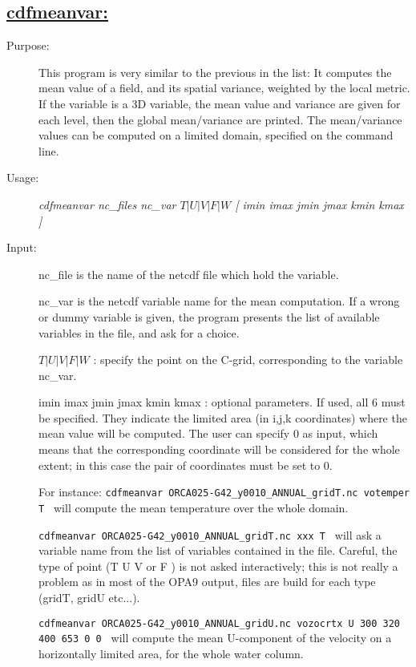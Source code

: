\documentclass[a4paper,11pt]{article}
\begin{document}
\subsection*{\underline{cdfmeanvar:}}
\begin{description}
\item[Purpose:] This program is very similar to the previous in the list: It computes the mean value of a field, and its
 spatial variance, weighted by the local metric. If the variable is a 3D variable,
the mean value and variance are given for each level, then the global mean/variance are printed. The mean/variance values can be 
 computed on a limited domain, specified on the command line.
\item[Usage:] {\em cdfmeanvar nc\_files nc\_var  $T | U | V | F | W$ [ imin imax jmin jmax kmin kmax ] }
\item[Input:] nc\_file is the name of the netcdf file which hold the variable. 

nc\_var is the netcdf variable name for the mean computation. If a wrong or dummy variable is given, the program
presents the list of available variables in the file, and ask for a choice.

$ T | U | V | F | W $ : specify the point on the C-grid, corresponding to the variable nc\_var.

imin imax jmin jmax  kmin kmax : optional parameters. If used, all 6 must be specified. They indicate the limited
area (in i,j,k coordinates) where the mean value will be computed. The user can specify 0 as input, which means that
the corresponding coordinate will be considered for the whole extent; in this case the pair of coordinates must be set 
to 0. 

For instance: {\tt cdfmeanvar  ORCA025-G42\_y0010\_ANNUAL\_gridT.nc votemper T } will compute the mean temperature over
the whole domain.

 {\tt cdfmeanvar  ORCA025-G42\_y0010\_ANNUAL\_gridT.nc xxx T } will ask a variable name from the list of variables contained
in the file. Careful, the type of point (T U V or F ) is not asked interactively; this is not really a problem as in most
of the OPA9 output, files are build for each type (gridT, gridU etc...).

 {\tt cdfmeanvar  ORCA025-G42\_y0010\_ANNUAL\_gridU.nc vozocrtx U  300 320 400 653 0 0 } will compute the mean U-component
of the velocity on a horizontally limited area, for the whole water column. 


\end{description}
\end{document}
